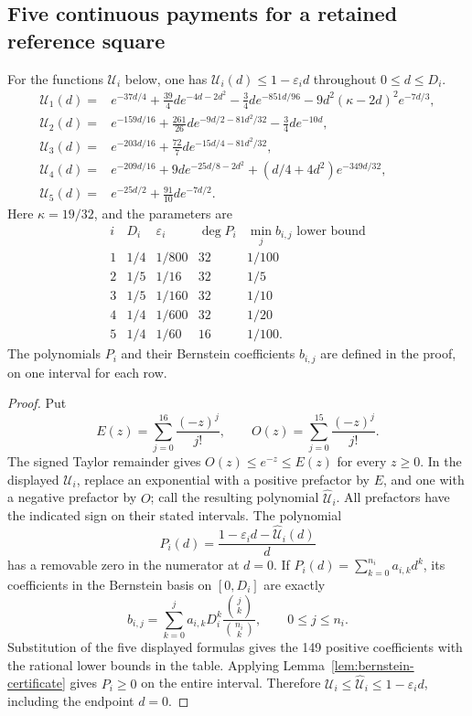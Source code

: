 \subsection{Five continuous payments for a retained reference square}
\label{sec:retained-reference-payments}
\begin{lemma}\label{lem:retained-reference-payments}
For the functions $\mathcal U_i$ below, one has
$\mathcal U_i(d)\le1-\varepsilon_i d$ throughout $0\le d\le D_i$.
\begin{align*}
 \mathcal U_1(d)={}&e^{-37d/4}
   +\frac{39}{4}d e^{-4d-2d^2}
   -\frac34d e^{-851d/96}
   -9d^2(\kappa-2d)^2e^{-7d/3},\\
 \mathcal U_2(d)={}&e^{-159d/16}
   +\frac{261}{26}d e^{-9d/2-81d^2/32}
   -\frac34d e^{-10d},\\
 \mathcal U_3(d)={}&e^{-203d/16}
   +\frac{72}{7}d e^{-15d/4-81d^2/32},\\
 \mathcal U_4(d)={}&e^{-209d/16}
   +9d e^{-25d/8-2d^2}
   +(d/4+4d^2)e^{-349d/32},\\
 \mathcal U_5(d)={}&e^{-25d/2}
   +\frac{91}{10}d e^{-7d/2}.
\end{align*}
Here $\kappa=19/32$, and the parameters are
\[
 \begin{array}{c|cc|cc}
  i&D_i&\varepsilon_i&\deg P_i&\min_j b_{i,j}\text{ lower bound}\\\hline
  1&1/4&1/800&32&1/100\\
  2&1/5&1/16&32&1/5\\
  3&1/5&1/160&32&1/10\\
  4&1/4&1/600&32&1/20\\
  5&1/4&1/60&16&1/100.
 \end{array}
\]
The polynomials $P_i$ and their Bernstein coefficients $b_{i,j}$ are
defined in the proof, on one interval for each row.
\end{lemma}
\begin{proof}
Put
\[
 E(z)=\sum_{j=0}^{16}\frac{(-z)^j}{j!},\qquad
 O(z)=\sum_{j=0}^{15}\frac{(-z)^j}{j!}.
\]
The signed Taylor remainder gives $O(z)\le e^{-z}\le E(z)$ for
every $z\ge0$. In the displayed $\mathcal U_i$, replace an exponential
with a positive prefactor by $E$, and one with a negative prefactor by
$O$; call the resulting polynomial $\widehat{\mathcal U}_i$.
All prefactors have the indicated sign on their stated intervals.
The polynomial
\[
 P_i(d)=\frac{1-\varepsilon_i d-\widehat{\mathcal U}_i(d)}{d}
\]
has a removable zero in the numerator at $d=0$.
If $P_i(d)=\sum_{k=0}^{n_i}a_{i,k}d^k$, its coefficients in
the Bernstein basis on $[0,D_i]$ are exactly
\[
 b_{i,j}=\sum_{k=0}^{j}
  a_{i,k}D_i^k\frac{\binom jk}{\binom{n_i}k},\qquad 0\le j\le n_i.
\]
Substitution of the five displayed formulas gives the 149 positive
coefficients with the rational lower bounds in the table.
 Applying
Lemma~\ref{lem:bernstein-certificate} gives $P_i\ge0$ on the entire
interval. Therefore
$\mathcal U_i\le\widehat{\mathcal U}_i\le1-\varepsilon_i d$,
including the endpoint $d=0$.
\end{proof}

